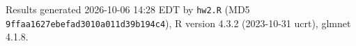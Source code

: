 Results generated 2026-10-06 14:28 EDT by \texttt{hw2.R} (MD5 \texttt{9ffaa1627ebefad3010a011d39b194c4}), R version 4.3.2 (2023-10-31 ucrt), glmnet 4.1.8.

